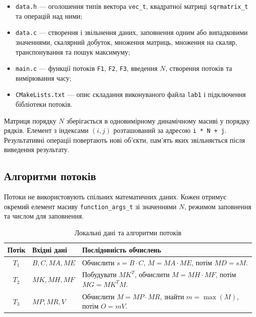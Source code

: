 \documentclass[12pt,a4paper]{article}
\begin{document}
\begin{itemize}[leftmargin=*,itemsep=0.3em]
  \item \texttt{data.h} --- оголошення типів вектора \texttt{vec\_t},
    квадратної матриці \texttt{sqrmatrix\_t} та операцій над ними;
  \item \texttt{data.c} --- створення і звільнення даних, заповнення одним
    або випадковими значеннями, скалярний добуток, множення матриць,
    множення на скаляр, транспонування та пошук максимуму;
  \item \texttt{main.c} --- функції потоків \texttt{F1}, \texttt{F2},
    \texttt{F3}, введення \(N\), створення потоків та вимірювання часу;
  \item \texttt{CMakeLists.txt} --- опис складання виконуваного файла
    \texttt{lab1} і підключення бібліотеки потоків.
\end{itemize}

Матриця порядку \(N\) зберігається в одновимірному динамічному масиві у
порядку рядків. Елемент з індексами \((i,j)\) розташований за адресою
\texttt{i * N + j}. Результативні операції повертають нові об'єкти, пам'ять
яких звільняється після виведення результату.

\subsection{Алгоритми потоків}

Потоки не використовують спільних математичних даних. Кожен отримує
окремий елемент масиву \texttt{function\_args\_t} зі значеннями \(N\),
режимом заповнення та числом для заповнення.

\begin{table}[H]
  \centering
  \renewcommand{\arraystretch}{1.25}
  \begin{tabular}{|c|p{4.2cm}|p{7.3cm}|}
    \hline
    \textbf{Потік} & \textbf{Вхідні дані} & \textbf{Послідовність обчислень} \\
    \hline
    \(T_1\) & \(B,C,MA,ME\) &
      Обчислити \(s=B\cdot C\), \(M=MA\cdot ME\), потім \(MD=sM\). \\
    \hline
    \(T_2\) & \(MK,MH,MF\) &
      Побудувати \(MK^T\), обчислити \(M=MH\cdot MF\), потім
      \(MG=MK^T M\). \\
    \hline
    \(T_3\) & \(MP,MR,V\) &
      Обчислити \(M=MP\cdot MR\), знайти \(m=\max(M)\), потім
      \(O=mV\). \\
    \hline
  \end{tabular}
  \caption{Локальні дані та алгоритми потоків}
  \label{tab:threads}
\end{table}
\end{document}
